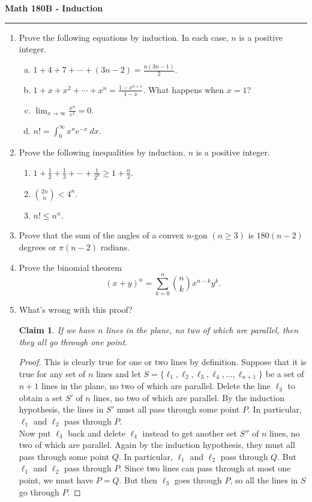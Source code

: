 \documentclass[11pt,letterpaper]{report}
\newtheorem*{claim*}{Claim}
\begin{document}
\begin{center}
{\bf \Large Math 180B - Induction}
\vspace{0.2cm}
\hrule
\end{center}

\begin{enumerate}
	\item Prove the following equations by induction. In each case, $n$ is a positive integer.
	\begin{enumerate}[(a)]
		\item $1+4+7 + \cdots + (3n-2) = \frac{n(3n-1)}{2}$.
		\item $1+x+x^2 + \cdots + x^n = \frac{1-x^{n+1}}{1-x}$. What happens when $x = 1$?
		\item $\lim_{x\to \infty}\frac{x^n}{e^x} = 0$.
		\item $n! = \int_0^\infty x^ne^{-x}\ dx$.
	\end{enumerate}

	\item Prove the following inequalities by induction. $n$ is a positive integer.
	\begin{enumerate}
		\item $1+\frac{1}{2} + \frac{1}{3} + \cdots + \frac{1}{2^n} \geq 1+\frac{n}{2}$.
		\item $\binom{2n}{n}<4^n$.
		\item $n!\leq n^n$.
	\end{enumerate}

	\item Prove that the sum of the angles of a convex $n$-gon $(n\geq 3)$ is $180(n-2)$ degrees or $\pi(n-2)$ radians.

	\item Prove the binomial theorem
	\[
	(x+y)^n= \sum_{k=0}^n\binom{n}{k}x^{n-k}y^k.
	\]

	\item What's wrong with this proof?
	\begin{claim*}
		If we have $n$ lines in the plane, no two of which are parallel, then they all go through one point.
	\end{claim*}
	\begin{proof}
		This is clearly true for one or two lines by definition. Suppose that it is true for any set of $n$ lines and let $S = \{\ell_1, \ell_2, \ell_3, \ell_4,  \ldots, \ell_{n+1}\}$ be a set of $n+1$ lines in the plane, no two of which are parallel. Delete the line $\ell_3$ to obtain a set $S'$ of $n$ lines, no two of which are parallel. By the induction hypothesis, the lines in $S'$ must all pass through some point $P$. In particular, $\ell_1$ and $\ell_2$ pass through $P$.\\

		\noindent Now put $\ell_3$ back and delete $\ell_4$ instead to get another set $S''$ of $n$ lines, no two of which are parallel. Again by the induction hypothesis, they must all pass through some point $Q$. In particular, $\ell_1$ and $\ell_2$ pass through $Q$. But $\ell_1$ and $\ell_2$ pass through $P$. Since two lines can pass through at most one point, we must have $P = Q$. But then $\ell_3$ goes through $P$, so all the lines in $S$ go through $P$.
	\end{proof}
\end{enumerate}
\end{document}
